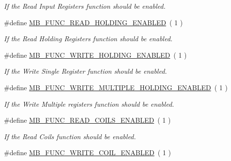 \begin{DoxyCompactItemize}
\begin{DoxyCompactList}\small\item\em If the {\itshape Read Input Registers} function should be enabled. \end{DoxyCompactList}\item 
\#define \hyperlink{group__modbus__cfg_ga2427219b5788299b59972102db511df8}{M\+B\+\_\+\+F\+U\+N\+C\+\_\+\+R\+E\+A\+D\+\_\+\+H\+O\+L\+D\+I\+N\+G\+\_\+\+E\+N\+A\+B\+L\+ED}~(  1 )\hypertarget{group__modbus__cfg_ga2427219b5788299b59972102db511df8}{}\label{group__modbus__cfg_ga2427219b5788299b59972102db511df8}

\begin{DoxyCompactList}\small\item\em If the {\itshape Read Holding Registers} function should be enabled. \end{DoxyCompactList}\item 
\#define \hyperlink{group__modbus__cfg_gae8aa746269641b5fe032b81aafd93521}{M\+B\+\_\+\+F\+U\+N\+C\+\_\+\+W\+R\+I\+T\+E\+\_\+\+H\+O\+L\+D\+I\+N\+G\+\_\+\+E\+N\+A\+B\+L\+ED}~(  1 )\hypertarget{group__modbus__cfg_gae8aa746269641b5fe032b81aafd93521}{}\label{group__modbus__cfg_gae8aa746269641b5fe032b81aafd93521}

\begin{DoxyCompactList}\small\item\em If the {\itshape Write Single Register} function should be enabled. \end{DoxyCompactList}\item 
\#define \hyperlink{group__modbus__cfg_gaafa15ddf4a433ab3149178ba8199e8e2}{M\+B\+\_\+\+F\+U\+N\+C\+\_\+\+W\+R\+I\+T\+E\+\_\+\+M\+U\+L\+T\+I\+P\+L\+E\+\_\+\+H\+O\+L\+D\+I\+N\+G\+\_\+\+E\+N\+A\+B\+L\+ED}~(  1 )\hypertarget{group__modbus__cfg_gaafa15ddf4a433ab3149178ba8199e8e2}{}\label{group__modbus__cfg_gaafa15ddf4a433ab3149178ba8199e8e2}

\begin{DoxyCompactList}\small\item\em If the {\itshape Write Multiple registers} function should be enabled. \end{DoxyCompactList}\item 
\#define \hyperlink{group__modbus__cfg_ga0a699b69e28d21c32c95affe08e04112}{M\+B\+\_\+\+F\+U\+N\+C\+\_\+\+R\+E\+A\+D\+\_\+\+C\+O\+I\+L\+S\+\_\+\+E\+N\+A\+B\+L\+ED}~(  1 )\hypertarget{group__modbus__cfg_ga0a699b69e28d21c32c95affe08e04112}{}\label{group__modbus__cfg_ga0a699b69e28d21c32c95affe08e04112}

\begin{DoxyCompactList}\small\item\em If the {\itshape Read Coils} function should be enabled. \end{DoxyCompactList}\item 
\#define \hyperlink{group__modbus__cfg_ga3bb42e153880ea5312eaa42bb671ee50}{M\+B\+\_\+\+F\+U\+N\+C\+\_\+\+W\+R\+I\+T\+E\+\_\+\+C\+O\+I\+L\+\_\+\+E\+N\+A\+B\+L\+ED}~(  1 )\hypertarget{group__modbus__cfg_ga3bb42e153880ea5312eaa42bb671ee50}{}\label{group__modbus__cfg_ga3bb42e153880ea5312eaa42bb671ee50}


\end{DoxyCompactItemize}
